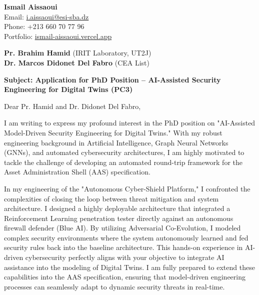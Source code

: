 \documentclass[11pt,a4paper]{article}
\begin{document}
\thispagestyle{empty}

\begin{flushright}
\textbf{Ismail Aissaoui} \\
Email: \href{mailto:i.aissaoui@esi-sba.dz}{i.aissaoui@esi-sba.dz} \\
Phone: +213 660 70 77 96 \\
Portfolio: \href{https://ismail-aissaoui.vercel.app}{ismail-aissaoui.vercel.app}
\end{flushright}

\vspace{1em}

\begin{flushleft}
\textbf{Pr. Brahim Hamid} (IRIT Laboratory, UT2J) \\
\textbf{Dr. Marcos Didonet Del Fabro} (CEA List)
\end{flushleft}

\vspace{1em}
\noindent\textbf{Subject: Application for PhD Position -- AI-Assisted Security Engineering for Digital Twins (PC3)}
\vspace{1em}

\noindent Dear Pr. Hamid and Dr. Didonet Del Fabro,

\vspace{1em}
\noindent
I am writing to express my profound interest in the PhD position on "AI-Assisted Model-Driven Security Engineering for Digital Twins." With my robust engineering background in Artificial Intelligence, Graph Neural Networks (GNNs), and automated cybersecurity architectures, I am highly motivated to tackle the challenge of developing an automated round-trip framework for the Asset Administration Shell (AAS) specification.

\vspace{0.5em}
\noindent
In my engineering of the "Autonomous Cyber-Shield Platform," I confronted the complexities of closing the loop between threat mitigation and system architecture. I designed a highly deployable architecture that integrated a Reinforcement Learning penetration tester directly against an autonomous firewall defender (Blue AI). By utilizing Adversarial Co-Evolution, I modeled complex security environments where the system autonomously learned and fed security rules back into the baseline architecture. This hands-on experience in AI-driven cybersecurity perfectly aligns with your objective to integrate AI assistance into the modeling of Digital Twins. I am fully prepared to extend these capabilities into the AAS specification, ensuring that model-driven engineering processes can seamlessly adapt to dynamic security threats in real-time.
\end{document}
